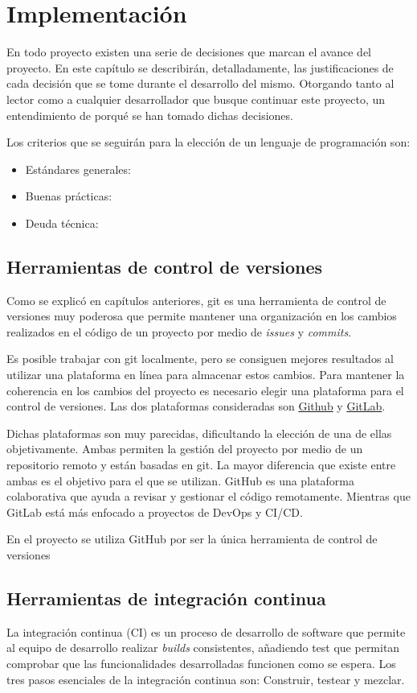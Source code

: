 \chapter{Implementación}
En todo proyecto existen una serie de decisiones que marcan el avance del proyecto. En este capítulo se describirán, detalladamente, las justificaciones de cada decisión que se tome durante el desarrollo del mismo. Otorgando tanto al lector como a cualquier desarrollador que busque continuar este proyecto, un entendimiento de porqué se han tomado dichas decisiones.

Los criterios que se seguirán para la elección de un lenguaje de programación son: 
\begin{itemize}
    \item Estándares generales: 
    \item Buenas prácticas:
    \item Deuda técnica: 
\end{itemize}

\section{Herramientas de control de versiones}
Como se explicó en capítulos anteriores, \Gls{git} es una herramienta de control de versiones muy poderosa que permite mantener una organización en los cambios realizados en el código de un proyecto por medio de \emph{issues} y \emph{commits}.

Es posible trabajar con \Gls{git} localmente, pero se consiguen mejores resultados al utilizar una plataforma en línea para almacenar estos cambios. Para mantener la coherencia en los cambios del proyecto es necesario elegir una plataforma para el control de versiones. Las dos plataformas consideradas son \href{https://github.com/}{Github} y \href{https://about.gitlab.com/}{GitLab}. 

Dichas plataformas son muy parecidas, dificultando la elección de una de ellas objetivamente. Ambas permiten la gestión del proyecto por medio de un repositorio remoto y están basadas en \Gls{git}. La mayor diferencia que existe entre ambas es el objetivo para el que se utilizan. GitHub es una plataforma colaborativa que ayuda a revisar y gestionar el código remotamente. Mientras que GitLab está más enfocado a proyectos de DevOps y CI/CD. \cite{VCS2022}

En el proyecto se utiliza GitHub por ser la única herramienta de control de versiones  

\section{Herramientas de integración continua}
La integración continua (CI) es un proceso de desarrollo de software que permite al equipo de desarrollo realizar \emph{builds} consistentes, añadiendo test que permitan comprobar que las funcionalidades desarrolladas funcionen como se espera. Los tres pasos esenciales de la integración continua son: Construir, testear y mezclar. \cite{virtanen2021comparing}

